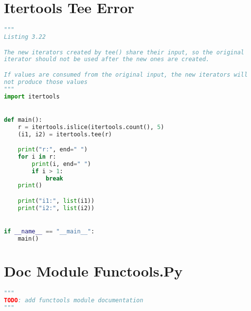 \documentclass[a4paper,landscape]{report}
\begin{document}
\section{Itertools Tee Error}
\begin{lstlisting}[language=Python]
"""
Listing 3.22

The new iterators created by tee() share their input, so the original
iterator should not be used after the new ones are created.

If values are consumed from the original input, the new iterators will
not produce those values
"""
import itertools


def main():
    r = itertools.islice(itertools.count(), 5)
    (i1, i2) = itertools.tee(r)

    print("r:", end=" ")
    for i in r:
        print(i, end=" ")
        if i > 1:
            break
    print()

    print("i1:", list(i1))
    print("i2:", list(i2))


if __name__ == "__main__":
    main()

\end{lstlisting}
\section{Doc Module Functools.Py}
\begin{lstlisting}[language=Python]
"""
TODO: add functools module documentation
"""
\end{lstlisting}
\end{document}
